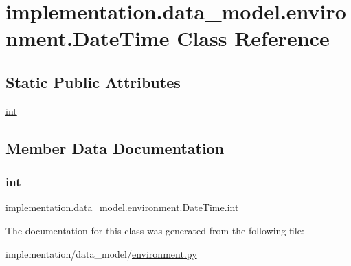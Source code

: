 \hypertarget{classimplementation_1_1data__model_1_1environment_1_1_date_time}{}\section{implementation.\+data\+\_\+model.\+environment.\+Date\+Time Class Reference}
\label{classimplementation_1_1data__model_1_1environment_1_1_date_time}
\subsection*{Static Public Attributes}
\begin{DoxyCompactItemize}
\item 
\hyperlink{classimplementation_1_1data__model_1_1environment_1_1_date_time_a81f9c53a5b8bebd70a85f3edcc961862}{int}
\end{DoxyCompactItemize}


\subsection{Member Data Documentation}
\mbox{\label{classimplementation_1_1data__model_1_1environment_1_1_date_time_a81f9c53a5b8bebd70a85f3edcc961862}} 
\subsubsection{\texorpdfstring{int}{int}}
{\footnotesize\ttfamily implementation.\+data\+\_\+model.\+environment.\+Date\+Time.\+int\hspace{0.3cm}{\ttfamily [static]}}



The documentation for this class was generated from the following file\+:\begin{DoxyCompactItemize}
\item 
implementation/data\+\_\+model/\hyperlink{environment_8py}{environment.\+py}\end{DoxyCompactItemize}
